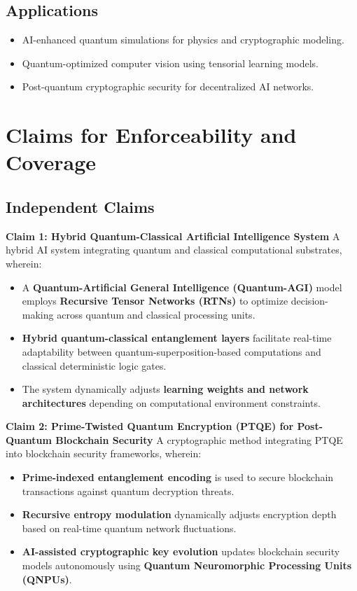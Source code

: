 \documentclass{article}
\theoremstyle{plain}
\begin{document}
\subsection{Applications}
\begin{itemize}
    \item AI-enhanced quantum simulations for physics and cryptographic modeling.
    \item Quantum-optimized computer vision using tensorial learning models.
    \item Post-quantum cryptographic security for decentralized AI networks.
\end{itemize}

\section{Claims for Enforceability and Coverage}

\subsection{Independent Claims}

\noindent \textbf{Claim 1: Hybrid Quantum-Classical Artificial Intelligence System}  
A hybrid AI system integrating quantum and classical computational substrates, wherein:

\begin{itemize}
    \item A \textbf{Quantum-Artificial General Intelligence (Quantum-AGI)} model employs \textbf{Recursive Tensor Networks (RTNs)} to optimize decision-making across quantum and classical processing units.
    \item \textbf{Hybrid quantum-classical entanglement layers} facilitate real-time adaptability between quantum-superposition-based computations and classical deterministic logic gates.
    \item The system dynamically adjusts \textbf{learning weights and network architectures} depending on computational environment constraints.
\end{itemize}

\noindent \textbf{Claim 2: Prime-Twisted Quantum Encryption (PTQE) for Post-Quantum Blockchain Security}  
A cryptographic method integrating PTQE into blockchain security frameworks, wherein:

\begin{itemize}
    \item \textbf{Prime-indexed entanglement encoding} is used to secure blockchain transactions against quantum decryption threats.
    \item \textbf{Recursive entropy modulation} dynamically adjusts encryption depth based on real-time quantum network fluctuations.
    \item \textbf{AI-assisted cryptographic key evolution} updates blockchain security models autonomously using \textbf{Quantum Neuromorphic Processing Units (QNPUs)}.
\end{itemize}
\end{document}
